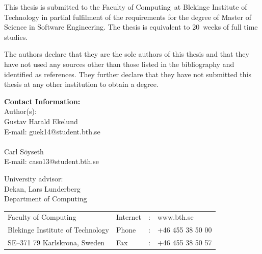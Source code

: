 \documentclass[a4paper,twoside]{bth}
\makeatletter
\newcommand{\thesisDegree}{Master of Science in Software Engineering}
\newcommand{\faculty}{Computing}
\newcommand{\thesisWeeks}{20}
\newcommand{\authorFirst}{Gustav Harald Ekelund}
\newcommand{\authorFirstMail}{guek14@student.bth.se}
\newcommand{\authorSecond}{Carl Söyseth}
\newcommand{\authorSecondMail}{caso13@student.bth.se}
\newcommand{\super}{Dekan, Lars Lunderberg}
\newcommand{\superAffiliation}{Computing}
\makeatother
\begin{document}
{\pagestyle{empty}
\changepage{3cm}{1cm}{-0.5cm}{-0.5cm}{}{-1.5cm}{}{}{}

{\small
\noindent
This thesis is submitted to the Faculty of \faculty\ at Blekinge Institute
of Technology in partial fulfilment of the requirements for the degree of
\thesisDegree. The thesis is equivalent to \thesisWeeks\ weeks of full time studies.

\vspace{1cm}

\noindent
The authors declare that they are the sole authors of this thesis and that they have
not used any sources other than those listed in the bibliography and identified as references.
They further declare that they have not submitted this thesis at any other institution to
obtain a degree.
}

\vspace{10cm}

\noindent
\textbf{Contact Information:} \\
Author(s): \\
\authorFirst \\
E-mail: \authorFirstMail \\
\\
\authorSecond \\
E-mail: \authorSecondMail

\vspace{2cm}

\noindent
University advisor: \\
\super \\
Department of \superAffiliation

\vspace*{\fill}

\noindent
\begin{tabular}{@{}p{} l c l}
Faculty of \faculty              & Internet & : & www.bth.se \\
Blekinge Institute of Technology & Phone    & : & +46 455 38 50 00 \\
SE--371 79 Karlskrona, Sweden    & Fax      & : & +46 455 38 50 57 \\
\end{tabular}
\clearpage
} %

\setcounter{page}{1}

\end{document}
